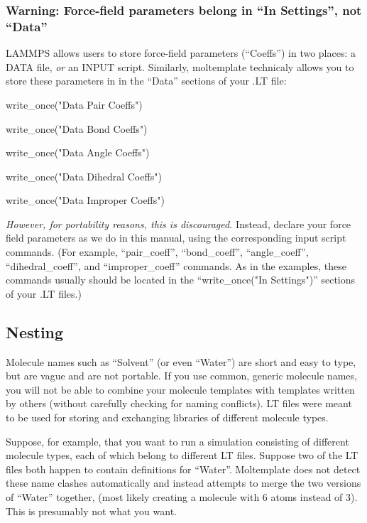\documentclass[11pt]{article}
\begin{document}
\subsubsection*{Warning: Force-field parameters belong in ``In Settings'', not ``Data''}

LAMMPS allows users to store force-field parameters (``Coeffs'') in two places:
a DATA file, \textit{or} an INPUT script. 
Similarly, moltemplate technicaly allows you to store these parameters in 
in the ``Data'' sections of your .LT file:
\begin{list}{}
\item write\_once("Data Pair Coeffs")
\item write\_once("Data Bond Coeffs")
\item write\_once("Data Angle Coeffs")
\item write\_once("Data Dihedral Coeffs")
\item write\_once("Data Improper Coeffs")
\item
\end{list}

\textit{However, for portability reasons, this is discouraged.} 
Instead, declare your force field parameters 
as we do in this manual, 
using the corresponding input script commands.
(For example, ``pair\_coeff'', ``bond\_coeff'', ``angle\_coeff'',
 ``dihedral\_coeff'', and ``improper\_coeff'' commands.
As in the examples, these commands usually should be located in the
``write\_once("In Settings")'' sections of your .LT files.)


\subsection{Nesting}
\label{sec:nesting}
Molecule names such as ``Solvent'' (or even ``Water'')
are short and easy to type, but are vague and are not portable.
If you use common, generic molecule names, you will not be able
to combine your molecule templates with templates written 
by others (without carefully checking for naming conflicts).
LT files were meant to be used for storing 
and exchanging libraries of different molecule types.

Suppose, for example, that you want to run a simulation consisting of
different molecule types, each of which belong to different LT files.
Suppose two of the LT files both happen to contain definitions for
``Water''.
Moltemplate does not detect these name clashes automatically 
and instead attempts to merge the two versions of ``Water'' together,
(most likely creating a molecule with 6 atoms instead of 3).
This is presumably not what you want.
\end{document}
